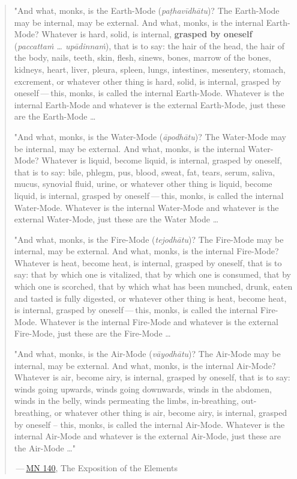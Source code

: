 \begin{quote}
"And what, monks, is the Earth-Mode (\emph{paṭhavīdhātu})? The Earth-Mode may be internal, may be external. And what, monks, is the internal Earth-Mode? Whatever is hard, solid, is internal, \textbf{grasped by oneself} (\emph{paccattaṁ \ldots{} upādinnaṁ}), that is to say: the hair of the head, the hair of the body, nails, teeth, skin, flesh, sinews, bones, marrow of the bones, kidneys, heart, liver, pleura, spleen, lungs, intestines, mesentery, stomach, excrement, or whatever other thing is hard, solid, is internal, grasped by oneself --- this, monks, is called the internal Earth-Mode. Whatever is the internal Earth-Mode and whatever is the external Earth-Mode, just these are the Earth-Mode \ldots{}

"And what, monks, is the Water-Mode (\emph{āpodhātu})? The Water-Mode may be internal, may be external. And what, monks, is the internal Water-Mode? Whatever is liquid, become liquid, is internal, grasped by oneself, that is to say: bile, phlegm, pus, blood, sweat, fat, tears, serum, saliva, mucus, synovial fluid, urine, or whatever other thing is liquid, become liquid, is internal, grasped by oneself --- this, monks, is called the internal Water-Mode. Whatever is the internal Water-Mode and whatever is the external Water-Mode, just these are the Water Mode \ldots{}

"And what, monks, is the Fire-Mode (\emph{tejodhātu})? The Fire-Mode may be internal, may be external. And what, monks, is the internal Fire-Mode? Whatever is heat, become heat, is internal, grasped by oneself, that is to say: that by which one is vitalized, that by which one is consumed, that by which one is scorched, that by which what has been munched, drunk, eaten and tasted is fully digested, or whatever other thing is heat, become heat, is internal, grasped by oneself --- this, monks, is called the internal Fire-Mode. Whatever is the internal Fire-Mode and whatever is the external Fire-Mode, just these are the Fire-Mode \ldots{}

"And what, monks, is the Air-Mode (\emph{vāyodhātu})? The Air-Mode may be internal, may be external. And what, monks, is the internal Air-Mode? Whatever is air, become airy, is internal, grasped by oneself, that is to say: winds going upwards, winds going downwards, winds in the abdomen, winds in the belly, winds permeating the limbs, in-breathing, out-breathing, or whatever other thing is air, become airy, is internal, grasped by oneself -- this, monks, is called the internal Air-Mode. Whatever is the internal Air-Mode and whatever is the external Air-Mode, just these are the Air-Mode \ldots"

 --- \href{https://suttacentral.net/mn140/en/bodhi}{MN 140}, The Exposition of the Elements
\end{quote}

